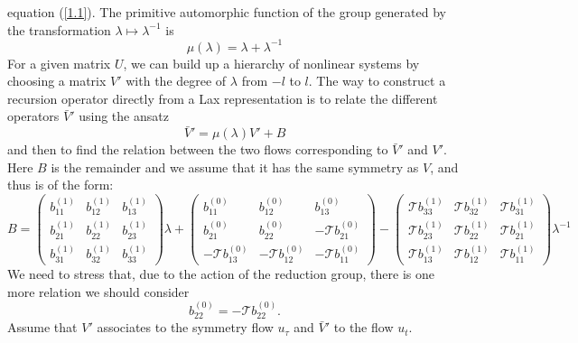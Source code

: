 \documentclass[fleqn,11pt,twoside]{article}
\theoremstyle{definition}
\begin{document}
equation (\ref{1.1}). The primitive automorphic function
of the group generated by the transformation $\lambda\mapsto \lambda^{-1}$ is
	\begin{equation}
		\mu(\lambda) = \lambda + \lambda^{-1}
		\label{prim}
	\end{equation}
For a given matrix $U$, we can build up a hierarchy of nonlinear systems by
choosing a matrix $V'$ with the degree of $\lambda$ from $-l$ to $l$.
The way to construct a recursion operator directly from a Lax representation
is to relate the different operators ${\bar V'}$ using the ansatz $${\bar
V'}=\mu (\lambda) V' +B$$ and then to find the relation between the two flows corresponding to
$\bar V'$ and $V'$. Here $B$ is the remainder and we assume that it
has the same symmetry as $V$, and thus is of the form:
	\begin{equation}
		B=\begin{pmatrix}
			b^{(1)}_{    11} & b^{(1)}_{    12} & b^{(1)}_{    13}\\
			b^{(1)}_{    21} & b^{(1)}_{    22} & b^{(1)}_{    23}\\
			b^{(1)}_{    31} & b^{(1)}_{    32} & b^{(1)}_{    33}
		\end{pmatrix} \lambda +
		\begin{pmatrix}
			b^{(0)}_{    11} & b^{(0)}_{    12} & b^{(0)}_{    13}\\
			b^{(0)}_{    21} & b^{(0)}_{    22} &
-\mathcal{T}b^{(0)}_{    21}\\
			-\mathcal{T}b^{(0)}_{    13} & -\mathcal{T}b^{(0)}_{
12} & -\mathcal{T}b^{(0)}_{    11}
		\end{pmatrix}-
		\begin{pmatrix}
			\mathcal{T} b^{(1)}_{    33} &  \mathcal{T} b^{(1)}_{
  32} &\mathcal{T}b^{(1)}_{    31}\\
			\mathcal{T} b^{(1)}_{    23} &  \mathcal{T} b^{(1)}_{
  22} &\mathcal{T}b^{(1)}_{    21}\\
			\mathcal{T} b^{(1)}_{    13} &  \mathcal{T} b^{(1)}_{
  12} &\mathcal{T}b^{(1)}_{    11}
		\end{pmatrix} \lambda^{-1}
		\label{3.6b}
	\end{equation}
	We need to stress that, due to the action of the reduction group, there
is one more relation we should consider
	\begin{equation}
		b^{(0)}_{    22} = -\mathcal{T}b^{(0)}_{    22}.
		\label{5.1bis}
	\end{equation}
Assume that $V'$ associates to the symmetry flow $u_{\tau}$ and $\bar V'$ to the flow $u_t$.
\end{document}
